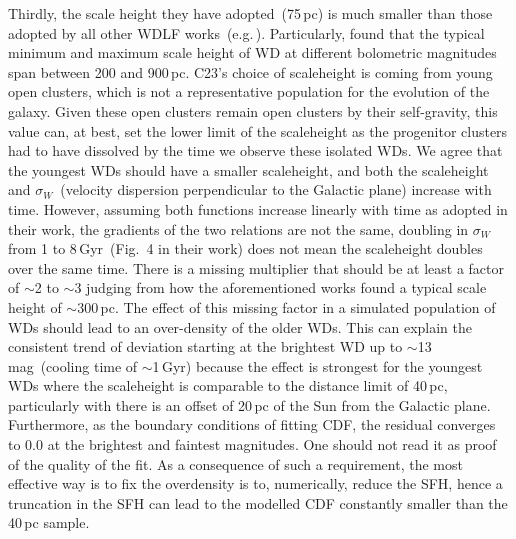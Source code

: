 \documentclass[fleqn,usenatbib]{mnras}
\begin{document}
Thirdly, the scale height they have adopted~(75\,pc) is much smaller than those
adopted by all other WDLF works~(e.g.\,\citealt{2006AJ....131..571H,
2011MNRAS.417...93R, 2019MNRAS.482..715L}). Particularly,
\citet{2006AJ....131..571H} found that the typical minimum and maximum scale
height of WD at different bolometric magnitudes span between 200 and 900\,pc.
C23's choice of scaleheight is coming from young open clusters, which is not
a representative population for the evolution of the galaxy. Given these open
clusters remain open clusters by their self-gravity, this value can, at best,
set the lower limit of the scaleheight as the progenitor clusters had to have
dissolved by the time we observe these isolated WDs. We agree that the youngest
WDs should have a smaller scaleheight, and both the scaleheight and
$\sigma_W$~(velocity dispersion perpendicular to the Galactic plane) increase
with time. However, assuming both functions increase linearly with time as
adopted in their work, the gradients of the two relations are not the same,
doubling in $\sigma_W$ from 1 to 8\,Gyr~(Fig.~4 in their work) does not mean
the scaleheight doubles over the same time. There is a missing multiplier
that should be at least a factor of $\sim$2 to $\sim$3 judging from how the
aforementioned works found a typical scale height of $\sim$300\,pc. The
effect of this missing factor in a simulated population of WDs should lead to
an over-density of the older WDs. This can explain the consistent trend of 
deviation starting at the brightest WD up to $\sim$13\,mag~(cooling time of
$\sim$1\,Gyr) because the effect is strongest for the youngest WDs where the
scaleheight is comparable to the distance limit of 40\,pc, particularly with 
there is an offset of 20\,pc of the Sun from the Galactic plane. Furthermore,
as the boundary conditions of fitting CDF, the residual converges to 0.0 at the
brightest and faintest magnitudes. One should not read it as proof of the
quality of the fit. As a consequence of such a requirement, the most effective
way is to fix the overdensity is to, numerically, reduce the SFH, hence a
truncation in the SFH can lead to the modelled CDF constantly smaller than the
40\,pc sample.

\end{document}
